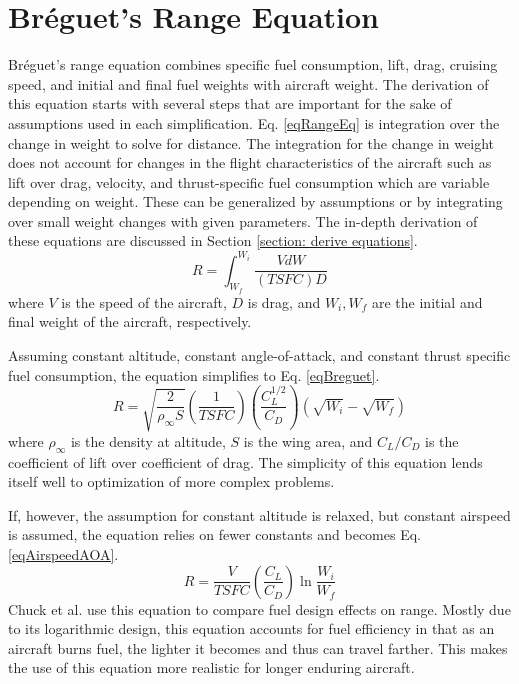 \section{Br\'eguet's Range Equation}
\hspace{.5cm} Br\'eguet's range equation combines specific fuel consumption, lift, drag, cruising speed, and initial and final fuel weights with aircraft weight. The derivation of this equation starts with several steps that are important for the sake of assumptions used in each simplification. Eq. \ref{eqRangeEq} is integration over the change in weight to solve for distance. The integration for the change in weight does not account for changes in the flight characteristics of the aircraft such as lift over drag, velocity, and thrust-specific fuel consumption which are variable depending on weight. These can be generalized by assumptions or by integrating over small weight changes with given parameters. The in-depth derivation of these equations are discussed in Section \ref{section: derive equations}.
\begin{equation}
    R = \int_{W_f}^{W_i}\dfrac{VdW}{(TSFC)D}
    \label{eqRangeEq}
\end{equation}
where $V$ is the speed of the aircraft, $D$ is drag, and $W_i,W_f$ are the initial and final weight of the aircraft, respectively. \par 
Assuming constant altitude, constant angle-of-attack, and constant thrust specific fuel consumption, the equation simplifies to Eq. \ref{eqBreguet}.
\begin{equation}
\label{eqBreguet}
R = \sqrt{\dfrac{2}{\rho_\infty S}}\left(\dfrac{1}{TSFC}\right) \left(\dfrac{C_L^{1/2}}{C_D}\right)(\sqrt{W_i}-\sqrt{W_f})
\end{equation}
where $\rho_\infty$ is the density at altitude, $S$ is the wing area, and $C_L/C_D$ is the coefficient of lift over coefficient of drag. The simplicity of this equation lends itself well to optimization of more complex problems. \par 
If, however, the assumption for constant altitude is relaxed, but constant airspeed is assumed, the equation relies on fewer constants and becomes Eq. \ref{eqAirspeedAOA}.
\begin{equation}
\label{eqAirspeedAOA}
    R = \dfrac{V}{TSFC}\left(\dfrac{C_L}{C_D}\right)\ln\dfrac{W_i}{W_f}
\end{equation}
Chuck et al. \cite{fuelsLOGRange} use this equation to compare fuel design effects on range. Mostly due to its logarithmic design, this equation accounts for fuel efficiency in that as an aircraft burns fuel, the lighter it becomes and thus can travel farther. This makes the use of this equation more realistic for longer enduring aircraft. \par
